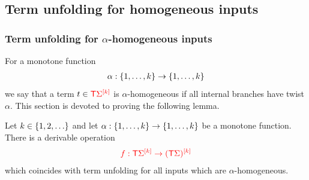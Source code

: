 
\subsection{Term unfolding for homogeneous inputs}
\label{sec:homo-unfold}



\subsubsection{Term unfolding for $\alpha$-homogeneous inputs}
\label{subsec:alpha-homo-unfold}

For a monotone function 
\begin{align*}
\alpha: \set{1,\ldots,k} \to \set{1,\ldots,k}
\end{align*}
we say that a term $ t \in \tmonad \mati k \rSigma$ is $\alpha$-homogeneous if all internal branches have twist $\alpha$. This section is devoted to proving the following lemma. 

\begin{lemma}\label{lem:homo-twist}
    Let $k \in \set{1,2,\ldots}$ and let $\alpha : \set{1,\ldots,k} \to \set{1,\ldots,k}$ be a monotone function. There is a derivable operation 
    \begin{align*}
        \ranked{f : \tmonad \mati k \rSigma \to \mati k {(\tmonad \Sigma)} }
        \end{align*}      
which coincides with term unfolding for all inputs which are $\alpha$-homogeneous.
\end{lemma}

